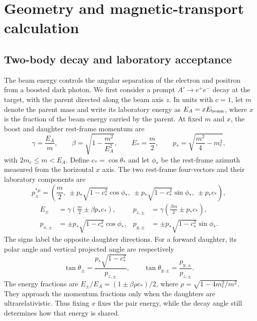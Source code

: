 \section{Geometry and magnetic-transport calculation}\label{app:v505-geometry}
\subsection{Two-body decay and laboratory acceptance}
\label{v571:kinematics}

The beam energy controls the angular separation of the electron and positron
from a boosted dark photon.  We first consider a prompt $A'\to e^+e^-$ decay
at the target, with the parent directed along the beam axis $z$.  In units with
$c=1$, let $m$ denote the parent mass and write its laboratory energy as
$E_A=xE_{\rm beam}$, where $x$ is the fraction of the beam energy carried by
the parent.  At fixed $m$ and $x$, the boost and daughter rest-frame momentum are
\begin{equation}
  \gamma=\frac{E_A}{m},\qquad
  \beta=\sqrt{1-\frac{m^2}{E_A^2}},\qquad
  E_* = \frac{m}{2},\qquad
  p_* = \sqrt{\frac{m^2}{4}-m_e^2},
  \label{v571:boost}
\end{equation}
with $2m_e\leq m<E_A$.  Define $c_*=\cos\theta_*$ and let $\phi_*$ be the
rest-frame azimuth measured from the horizontal $x$ axis.  The two rest-frame
four-vectors and their laboratory components are
\begin{equation}
  p_{\pm}^{*\mu}
    =\left(\frac m2,\ \pm p_*\sqrt{1-c_*^2}\cos\phi_*,\
       \pm p_*\sqrt{1-c_*^2}\sin\phi_*,\ \pm p_*c_*\right),
       \label{v571:rest-vectors}
\end{equation}
\begin{align}
  E_\pm&=\gamma\left(\frac m2\pm\beta p_*c_*\right),&
  p_{z,\pm}&=\gamma\left(\frac{\beta m}{2}\pm p_*c_*\right),
       \label{v571:lab-vectors}\\
  p_{x,\pm}&=\pm p_*\sqrt{1-c_*^2}\cos\phi_*,&
  p_{y,\pm}&=\pm p_*\sqrt{1-c_*^2}\sin\phi_* .
       \label{v571:transverse-vectors}
\end{align}
The signs label the opposite daughter directions.  For a forward daughter,
its polar angle and vertical projected angle are respectively
\begin{equation}
  \tan\theta_\pm=\frac{p_*\sqrt{1-c_*^2}}{p_{z,\pm}},\qquad
  \tan\theta_{y,\pm}=\frac{p_{y,\pm}}{p_{z,\pm}}.
  \label{v571:angles}
\end{equation}
The energy fractions are $E_\pm/E_A=(1\pm\beta\rho c_*)/2$, where
$\rho=\sqrt{1-4m_e^2/m^2}$.  They approach the momentum fractions only when
the daughters are ultrarelativistic.  Thus fixing $x$ fixes the pair energy,
while the decay angle still determines how that energy is shared.

